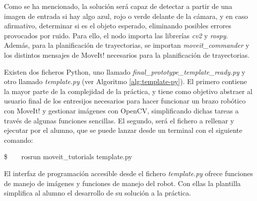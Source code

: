 \documentclass[12pt,spanish,chapterprefix, numbers=noenddot]{book}
\numberwithin{equation}{section}
\numberwithin{figure}{section}
\begin{document}
Como se ha mencionado, la solución será capaz de detectar a partir de una imagen de entrada si hay algo azul, rojo o verde delante de la cámara, y en caso afirmativo, determinar si es el objeto esperado, eliminando posibles errores provocados por ruido. 
Para ello, el nodo importa las librerías \textit{cv2} y \textit{rospy}. Además, para la planificación de trayectorias, se importan \textit{moveit\_commander} y los distintos mensajes de MoveIt! necesarios para la planificación de trayectorias.

Existen dos ficheros Python, uno llamado \textit{final\_prototype\_template\_ready.py} y otro llamado \textit{template.py} (ver Algoritmo \ref{alg:template-py}). 
El primero contiene la mayor parte de la complejidad de la práctica, y tiene como objetivo abstraer al usuario final de los entresijos necesarios para hacer funcionar un brazo robótico con MoveIt! y gestionar imágenes con OpenCV, simplificando dichas tareas a través de algunas funciones sencillas. El segundo, será el fichero a rellenar y ejecutar por el alumno, que se puede lanzar desde un terminal con el siguiente comando: 

\$\ \ \ \ rosrun moveit\_tutorials template.py
    
El interfaz de programación accesible desde el fichero \textit{template.py} ofrece funciones de manejo de imágenes y funciones de manejo del robot. Con ellas la plantilla simplifica al alumno el desarrollo de su solución a la práctica. 
\end{document}
